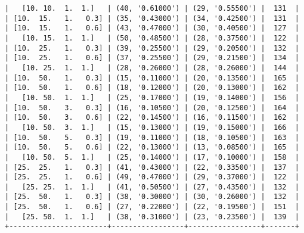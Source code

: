 \documentclass{article}
\begin{document}
\begin{verbatim}
|   [10. 10.  1.  1.]   | (40, '0.61000') | (29, '0.55500') |  131  |
| [10.  15.   1.   0.3] | (35, '0.43000') | (34, '0.42500') |  131  |
| [10.  15.   1.   0.6] | (43, '0.47000') | (30, '0.40500') |  127  |
|   [10. 15.  1.  1.]   | (50, '0.48500') | (28, '0.37500') |  122  |
| [10.  25.   1.   0.3] | (39, '0.25500') | (29, '0.20500') |  132  |
| [10.  25.   1.   0.6] | (37, '0.25500') | (29, '0.21500') |  134  |
|   [10. 25.  1.  1.]   | (28, '0.26000') | (28, '0.26000') |  144  |
| [10.  50.   1.   0.3] | (15, '0.11000') | (20, '0.13500') |  165  |
| [10.  50.   1.   0.6] | (18, '0.12000') | (20, '0.13000') |  162  |
|   [10. 50.  1.  1.]   | (25, '0.17000') | (19, '0.14000') |  156  |
| [10.  50.   3.   0.3] | (16, '0.10500') | (20, '0.12500') |  164  |
| [10.  50.   3.   0.6] | (22, '0.14500') | (16, '0.11500') |  162  |
|   [10. 50.  3.  1.]   | (15, '0.13000') | (19, '0.15000') |  166  |
| [10.  50.   5.   0.3] | (19, '0.11000') | (18, '0.10500') |  163  |
| [10.  50.   5.   0.6] | (22, '0.13000') | (13, '0.08500') |  165  |
|   [10. 50.  5.  1.]   | (25, '0.14000') | (17, '0.10000') |  158  |
| [25.  25.   1.   0.3] | (41, '0.43000') | (22, '0.33500') |  137  |
| [25.  25.   1.   0.6] | (49, '0.47000') | (29, '0.37000') |  122  |
|   [25. 25.  1.  1.]   | (41, '0.50500') | (27, '0.43500') |  132  |
| [25.  50.   1.   0.3] | (38, '0.30000') | (30, '0.26000') |  132  |
| [25.  50.   1.   0.6] | (27, '0.22000') | (22, '0.19500') |  151  |
|   [25. 50.  1.  1.]   | (38, '0.31000') | (23, '0.23500') |  139  |
+-----------------------+-----------------+-----------------+-------+
\end{verbatim}
\end{document}
